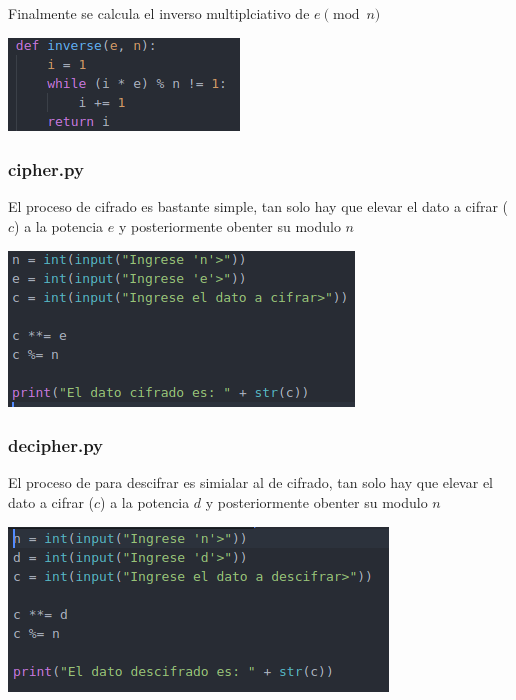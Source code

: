 \documentclass{article}
\begin{document}
  Finalmente se calcula el inverso multiplciativo de $e \pmod{n}$
  \begin{center}
    \includegraphics{img/inverse.png}
  \end{center}

  \subsubsection{cipher.py}
  El proceso de cifrado es bastante simple, tan solo hay que elevar el dato a cifrar ($c$) a la potencia $e$ y posteriormente obenter su modulo $n$
  \begin{center}
    \includegraphics{img/cipher.png}
  \end{center}

  \subsubsection{decipher.py}
  El proceso de para descifrar es simialar al de cifrado, tan solo hay que elevar el dato a cifrar ($c$) a la potencia $d$ y posteriormente obenter su modulo $n$
  \begin{center}
    \includegraphics{img/decipher.png}
  \end{center}
\end{document}
